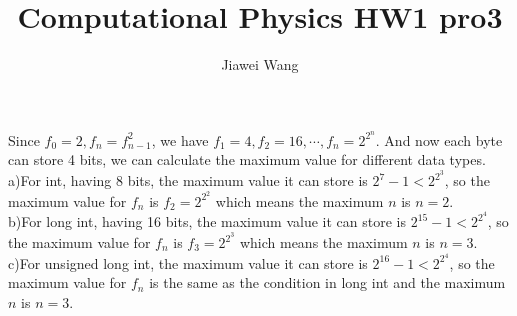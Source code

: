\documentclass[a4paper,12pt]{article}
\begin{document}
\title{Computational Physics HW1 pro3}
\author{Jiawei Wang}
\date{}
\maketitle

\noindent Since $f_0=2, f_n=f_{n-1}^2$, we have $f_1=4, f_2=16, \cdots, f_n=2^{2^n}$. And now each byte can store 4 bits, we can calculate the maximum value for different data types.\\
a)For int, having 8 bits, the maximum value it can store is $2^7-1<2^{2^3}$, so the maximum value for $f_n$ is $f_2=2^{2^2}$ which means the maximum $n$ is $n=2$.\\
b)For long int, having 16 bits, the maximum value it can store is $2^15-1<2^{2^4}$, so the maximum value for $f_n$ is $f_3=2^{2^3}$ which means the maximum $n$ is $n=3$.\\
c)For unsigned long int, the maximum value it can store is $2^16-1<2^{2^4}$, so the maximum value for $f_n$ is the same as the condition in long int and the maximum $n$ is $n=3$.
\end{document}
